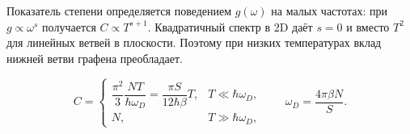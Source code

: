\documentclass[../final.tex]{subfiles}
\begin{document}
Показатель степени определяется поведением $g(\omega)$ на малых
частотах: при $g\propto\omega^s$ получается $C\propto T^{s+1}$.
Квадратичный спектр в 2D даёт $s=0$ и  вместо $T^2$ для линейных ветвей в плоскости.
Поэтому при низких температурах вклад нижней ветви графена
преобладает.

\answer
\[
    C=
    \begin{cases}
        \dfrac{\pi^2}3\dfrac{NT}{\hbar\omega_D}
          =\dfrac{\pi S}{12\hbar\beta}T, & T\ll\hbar\omega_D,\\[8pt]
        N, & T\gg\hbar\omega_D,
    \end{cases}
    \qquad \omega_D=\frac{4\pi\beta N}S.
\]
\end{document}

